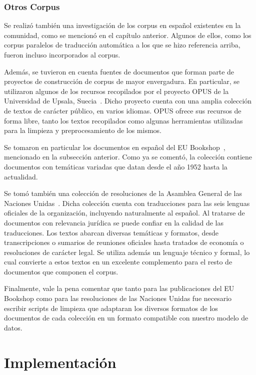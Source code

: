 \subsubsection{Otros Corpus}

Se realizó también una investigación de los corpus en español existentes en la comunidad, como se
mencionó en el capítulo anterior. Algunos de ellos, como los corpus paralelos de traducción
automática a los que se hizo referencia arriba, fueron incluso incorporados al corpus.

Además, se tuvieron en cuenta fuentes de documentos que forman parte de proyectos de construcción de
corpus de mayor envergadura. En particular, se utilizaron algunos de los recursos recopilados por el
proyecto OPUS de la Universidad de Upsala, Suecia~\cite{OPUS}. Dicho proyecto cuenta con una amplia
colección de textos de carácter público, en varios idiomas. OPUS ofrece sus recursos de forma libre,
tanto los textos recopilados como algunas herramientas utilizadas para la limpieza y
preprocesamiento de los mismos.

Se tomaron en particular los documentos en español del EU Bookshop~\cite{EUBookshop}, mencionado en
la subsección anterior. Como ya se comentó, la colección contiene documentos con temáticas variadas
que datan desde el año 1952 hasta la actualidad.

Se tomó también una colección de resoluciones de la Asamblea General de las Naciones
Unidas~\cite{MultiUNDownload}.  Dicha colección cuenta con traducciones para las seis lenguas
oficiales de la organización, incluyendo naturalmente al español. Al tratarse de documentos con
relevancia jurídica se puede confiar en la calidad de las traducciones. Los textos abarcan diversas
temáticas y formatos, desde transcripciones o sumarios de reuniones oficiales hasta tratados de
economía o resoluciones de carácter legal. Se utiliza además un lenguaje técnico y formal, lo cual
convierte a estos textos en un excelente complemento para el resto de documentos que componen el
corpus.

Finalmente, vale la pena comentar que tanto para las publicaciones del EU Bookshop como para las
resoluciones de las Naciones Unidas fue necesario escribir scripts de limpieza que adaptaran los diversos
formatos de los documentos de cada colección en un formato compatible con nuestro modelo de datos.


\section{Implementación}

